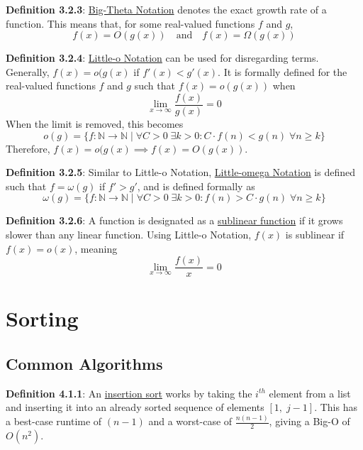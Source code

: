\documentclass{article}
\newcommand{\separate}[1] {\vspace{#1 pt}\noindent}
\newcommand{\N}{\mathbb{N}}
\newcommand{\definition}[2]{\textbf{Definition #1}: #2\label{def:#1}}
\begin{document}
\separate{7}\definition{3.2.3}{\underline{Big-Theta Notation} denotes the exact growth rate of a function. This means that, for some real-valued functions \(f\) and \(g\),}
\begin{equation}
    f(x) = O(g(x)) \quad\text{and}\quad f(x)=\Omega(g(x))
\end{equation}

\separate{7}\definition{3.2.4}{\underline{Little-o Notation} can be used for disregarding \say{small-order} terms. Generally, \(f(x) = o(g(x)\) if \(f'(x) < g'(x)\). It is formally defined for the real-valued functions \(f\) and \(g\) such that \(f(x) = o(g(x))\) when}
\begin{equation}
    \lim_{x\rightarrow\infty} \frac{f(x)}{g(x)} = 0
\end{equation}
When the limit is removed, this becomes
\begin{equation}
    o(g) = \{f: \N \rightarrow \N \;|\; \forall C > 0 \;\exists k > 0 : C \cdot f(n) < g(n) \;\forall n \geq k \} 
\end{equation}
Therefore, \(f(x) = o(g(x) \implies f(x) = O(g(x))\).

\newpage\noindent\definition{3.2.5}{Similar to Little-o Notation, \underline{Little-omega Notation} is defined such that \(f=\omega(g)\) if \(f' > g'\),}
and is defined formally as
\begin{equation}
    \omega(g) = \{f: \N \rightarrow \N \;|\; \forall C > 0 \;\exists k > 0 : f(n) > C \cdot g(n) \;\forall n \geq k \} 
\end{equation}

\separate{7}\definition{3.2.6}{A function is designated as a \underline{sublinear function} if it grows slower than any linear function. Using Little-o Notation, \(f(x)\) is sublinear if \(f(x) = o(x)\), meaning}
\begin{equation}
    \lim_{x \rightarrow \infty} \frac{f(x)}{x} = 0
\end{equation}

\section{Sorting}

\subsection{Common Algorithms}

\definition{4.1.1}{An \underline{insertion sort} works by taking the \(i^{th}\) element from a list and inserting it into an already sorted sequence of elements \([1,\;j-1]\).}
This has a best-case runtime of \((n-1)\) and a worst-case of \(\frac{n(n-1)}{2}\), giving a Big-O of \(O(n^2)\).
\end{document}
